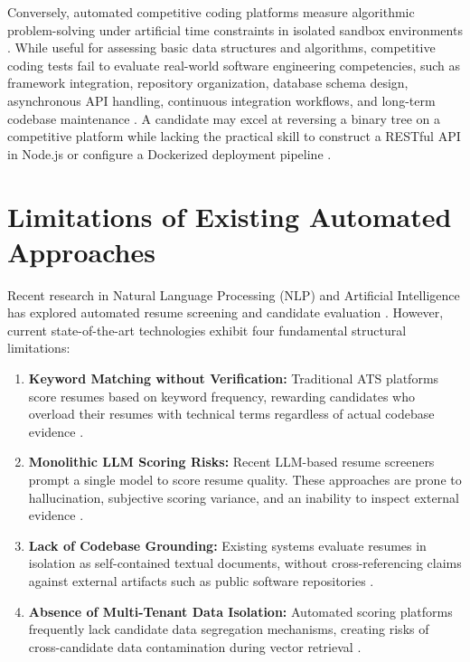 Conversely, automated competitive coding platforms measure algorithmic problem-solving under artificial time constraints in isolated sandbox environments \cite{ref15}. While useful for assessing basic data structures and algorithms, competitive coding tests fail to evaluate real-world software engineering competencies, such as framework integration, repository organization, database schema design, asynchronous API handling, continuous integration workflows, and long-term codebase maintenance \cite{ref3, ref26}. A candidate may excel at reversing a binary tree on a competitive platform while lacking the practical skill to construct a RESTful API in Node.js or configure a Dockerized deployment pipeline \cite{ref27, ref28}.

\section{Limitations of Existing Automated Approaches}

Recent research in Natural Language Processing (NLP) and Artificial Intelligence has explored automated resume screening and candidate evaluation \cite{ref1, ref11, ref23}. However, current state-of-the-art technologies exhibit four fundamental structural limitations:

\begin{enumerate}[leftmargin=*, label=\arabic*.]
    \item \textbf{Keyword Matching without Verification:} Traditional ATS platforms score resumes based on keyword frequency, rewarding candidates who overload their resumes with technical terms regardless of actual codebase evidence \cite{ref1, ref8}.
    \item \textbf{Monolithic LLM Scoring Risks:} Recent LLM-based resume screeners prompt a single model to score resume quality. These approaches are prone to hallucination, subjective scoring variance, and an inability to inspect external evidence \cite{ref20, ref17, ref29}.
    \item \textbf{Lack of Codebase Grounding:} Existing systems evaluate resumes in isolation as self-contained textual documents, without cross-referencing claims against external artifacts such as public software repositories \cite{ref30, ref31, ref32}.
    \item \textbf{Absence of Multi-Tenant Data Isolation:} Automated scoring platforms frequently lack candidate data segregation mechanisms, creating risks of cross-candidate data contamination during vector retrieval \cite{ref33, ref34}.
\end{enumerate}

